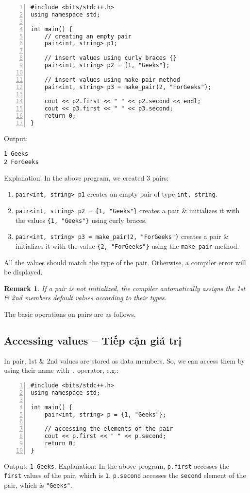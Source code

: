 \documentclass{article}
\newtheorem{remark}{Remark}
\begin{document}
\begin{Verbatim}[numbers=left,xleftmargin=5mm]
#include <bits/stdc++.h>
using namespace std;

int main() {
    // creating an empty pair
    pair<int, string> p1;
	
    // insert values using curly braces {}
    pair<int, string> p2 = {1, "Geeks"};
	
    // insert values using make_pair method
    pair<int, string> p3 = make_pair(2, "ForGeeks");
	
    cout << p2.first << " " << p2.second << endl;
    cout << p3.first << " " << p3.second;
    return 0;
}
\end{Verbatim}
Output:
\begin{verbatim}
1 Geeks
2 ForGeeks
\end{verbatim}
Explanation: In the above program, we created 3 pairs:
\begin{enumerate}
	\item {\tt pair<int, string> p1} creates an empty pair of type {\tt int, string}.
	\item \verb|pair<int, string> p2 = {1, "Geeks"}| creates a pair \& initializes it with the values \verb|{1, "Geeks"}| using curly braces.
	\item \verb|pair<int, string> p3 = make_pair(2, "ForGeeks")| creates a pair \& initializes it with the value \verb|{2, "ForGeeks"}| using the \verb|make_pair| method.
\end{enumerate}
All the values should match the type of the pair. Otherwise, a compiler error will be displayed.

\begin{remark}
	If a pair is not initialized, the compiler automatically assigns the 1st \& 2nd members default values according to their types.
\end{remark}
The basic operations on pairs are as follows.


\subsection{Accessing values -- Tiếp cận giá trị}
In pair, 1st \& 2nd values are stored as data members. So, we can access them by using their name with {\tt.} operator, e.g.:
\begin{Verbatim}[numbers=left,xleftmargin=5mm]
#include <bits/stdc++.h>
using namespace std;

int main() {
    pair<int, string> p = {1, "Geeks"};
	
    // accessing the elements of the pair
    cout << p.first << " " << p.second;
	return 0;
}
\end{Verbatim}
Output: {\tt1 Geeks}. Explanation: In the above program, {\tt p.first} accesses the {\tt first} values of the pair, which is {\tt1}. {\tt p.second} accesses the {\tt second} element of the pair, which is {\tt"Geeks"}.
\end{document}
